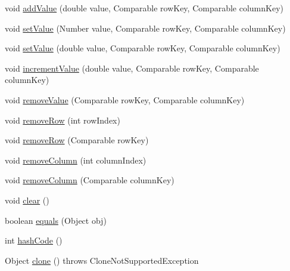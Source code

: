 \begin{DoxyCompactItemize}
\item 
void \mbox{\hyperlink{classorg_1_1jfree_1_1data_1_1category_1_1_default_category_dataset_af84ffaf6e88941e5dcbac30792c49dca}{add\+Value}} (double value, Comparable row\+Key, Comparable column\+Key)
\item 
void \mbox{\hyperlink{classorg_1_1jfree_1_1data_1_1category_1_1_default_category_dataset_afbcef15d23ebe245f352d0969f0f0460}{set\+Value}} (Number value, Comparable row\+Key, Comparable column\+Key)
\item 
void \mbox{\hyperlink{classorg_1_1jfree_1_1data_1_1category_1_1_default_category_dataset_ad3a83410649fd7748edd0a65678af779}{set\+Value}} (double value, Comparable row\+Key, Comparable column\+Key)
\item 
void \mbox{\hyperlink{classorg_1_1jfree_1_1data_1_1category_1_1_default_category_dataset_aa24286b2d1fa3d2a26ae81805e187c2f}{increment\+Value}} (double value, Comparable row\+Key, Comparable column\+Key)
\item 
void \mbox{\hyperlink{classorg_1_1jfree_1_1data_1_1category_1_1_default_category_dataset_adc052d373a3e65d0a9c955cb79fc2283}{remove\+Value}} (Comparable row\+Key, Comparable column\+Key)
\item 
void \mbox{\hyperlink{classorg_1_1jfree_1_1data_1_1category_1_1_default_category_dataset_a6c0fdda202f604d4c7536bafcf853723}{remove\+Row}} (int row\+Index)
\item 
void \mbox{\hyperlink{classorg_1_1jfree_1_1data_1_1category_1_1_default_category_dataset_ab15f418012a69d568cc956997c1e943d}{remove\+Row}} (Comparable row\+Key)
\item 
void \mbox{\hyperlink{classorg_1_1jfree_1_1data_1_1category_1_1_default_category_dataset_a0a509191e2ae0a4af3bb324023eb325b}{remove\+Column}} (int column\+Index)
\item 
void \mbox{\hyperlink{classorg_1_1jfree_1_1data_1_1category_1_1_default_category_dataset_a6ba7263d721920a0981bf339ad9bea7b}{remove\+Column}} (Comparable column\+Key)
\item 
void \mbox{\hyperlink{classorg_1_1jfree_1_1data_1_1category_1_1_default_category_dataset_ab88517b6c3c8fc71ff2a0bb302fc01ce}{clear}} ()
\item 
boolean \mbox{\hyperlink{classorg_1_1jfree_1_1data_1_1category_1_1_default_category_dataset_a91d70a6f7c8ff1862c11ba3a9e72e57f}{equals}} (Object obj)
\item 
int \mbox{\hyperlink{classorg_1_1jfree_1_1data_1_1category_1_1_default_category_dataset_aeaa8ef4f5e6e92be57da6c82304b6361}{hash\+Code}} ()
\item 
Object \mbox{\hyperlink{classorg_1_1jfree_1_1data_1_1category_1_1_default_category_dataset_acb420908cecd08b4d113d0a45ef5235a}{clone}} ()  throws Clone\+Not\+Supported\+Exception 
\end{DoxyCompactItemize}
